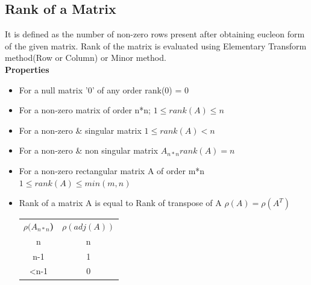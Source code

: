 \subsection{Rank of a Matrix}
It is defined as the number of non-zero rows present after obtaining eucleon form of the given matrix. Rank of the matrix is evaluated using Elementary Transform method(Row or Column) or Minor method.\vspace{0.5cm}\\
\textbf{Properties}
\begin{itemize}
    \item For a null matrix '0' of any order rank(0) = 0
    \item For a non-zero matrix of order n*n; \(1 \leq rank(A) \leq n\)
    \item For a non-zero \& singular matrix \(1 \leq rank(A) < n\)
    \item For a non-zero \& non singular matrix \(A_{n*n} rank(A) = n\)
    \item For a non-zero rectangular matrix A of order m*n \(1\leq rank(A)\leq min(m,n)\)
    \item Rank of a matrix A is equal to Rank of transpose of A \(\rho(A) = \rho(A^T) \)
    \begin{table}[h!]
    \centering
    \setlength{\tabcolsep}{1em}
    \tabulinesep=1.5mm
    \begin{tabu}{c c}
    \textbf{\(\rho(A_{n*n}\))} & \textbf{\(\rho(adj(A))\)} \\
    n                          & n                         \\
    n-1                        & 1                         \\
    \textless{}n-1             & 0                         \\
    \end{tabu}
    \end{table}
\end{itemize}


